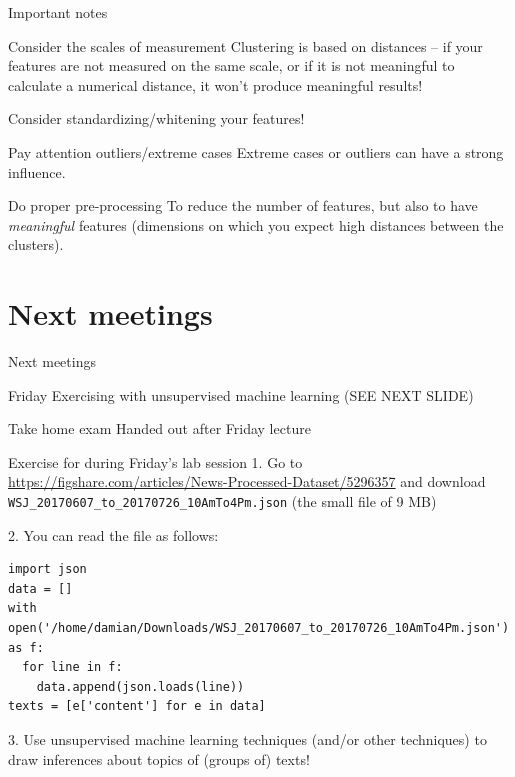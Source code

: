 \documentclass{beamer}
\begin{document}
\begin{frame}{Important notes}
\begin{block}{Consider the scales of measurement}
Clustering is based on distances -- if your features are not measured on the same scale, or if it is not meaningful to calculate a numerical distance, it won't produce meaningful results!

Consider standardizing/whitening your features!
\end{block}

\pause

\begin{block}{Pay attention outliers/extreme cases}
Extreme cases or outliers can have a strong influence.
\end{block}

\pause 
\begin{block}{Do proper pre-processing}
To reduce the number of features, but also to have \emph{meaningful} features (dimensions on which you expect high distances between the clusters).
\end{block}


\end{frame}


\section{Next meetings}

\begin{frame}{Next meetings}
\begin{block}{Friday}
Exercising with unsupervised machine learning (SEE NEXT SLIDE)
\end{block}

\begin{block}{Take home exam}
Handed out after Friday lecture
\end{block}

\end{frame}


\begin{frame}{Exercise for during Friday's lab session}
1. Go to \url{https://figshare.com/articles/News-Processed-Dataset/5296357} and download \texttt{WSJ\_20170607\_to\_20170726\_10AmTo4Pm.json} (the small file of 9 MB)


2. You can read the file as follows:

\begin{lstlisting}
import json
data = []
with   open('/home/damian/Downloads/WSJ_20170607_to_20170726_10AmTo4Pm.json') as f:
  for line in f:
    data.append(json.loads(line))
texts = [e['content'] for e in data]
\end{lstlisting}


3. Use unsupervised machine learning techniques (and/or other techniques) to draw inferences about topics of (groups of) texts!
\end{frame}
\end{document}
